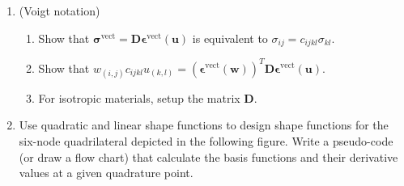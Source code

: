 \documentclass[12pt]{article}
\begin{document}
\begin{enumerate}
\begin{enumerate}
\item Consider the weak-form problem for elastostatics,
\begin{align*}
\int_{\Omega} w_{(i,j)} \sigma_{ij}d\Omega = \int_{\Omega} w_i f_i d\Omega + \int_{\Gamma_h} w_i h_i d\Gamma.
\end{align*}
If the test and trail function spaces are constructed by $C^0$ basis functions, show that
\begin{align*}
0 = \sum_{e=1}^{n_{el}} \int_{\Omega^e} w^h_i \left( \sigma^h_{ij,j} + f_i \right)d\Omega - \int_{\Gamma_h} w^h_i \left( \sigma^h_{ij}n_j - h_i \right) d\Gamma - \int_{\Gamma_{\mathrm{int}}} w^h_i \llbracket \sigma_{ij}n_j\rrbracket d\Gamma,
\end{align*}
wherein
\begin{align*}
\Gamma_{\mathrm{int}} := \cup_{e=1}^{n_{el}} \partial \Omega^e - \partial \Omega.
\end{align*}
From the above Euler-Lagrange equation, one may readily conclude that the Galerkin formulation implies
\begin{align*}
& \sigma_{ij,j} + f_i = 0, && \mbox{ in } \cup_{e=1}^{n_{el}} \Omega^e, \displaybreak[2]\\
& \sigma_{ij}n_j = h_i, && \mbox{ on } \Gamma_h, \displaybreak[2]\\
& \llbracket \sigma_{ij}n_j\rrbracket = 0, && \mbox{ on } \Gamma_{\mathrm{int}}.
\end{align*}
\end{enumerate}

\item(Voigt notation) 
\begin{enumerate}
\item Show that $\bm \sigma^{\mathrm{vect}} = \bm D \bm \epsilon^{\mathrm{vect}}(\bm u)$ is equivalent to $\sigma_{ij} = c_{ijkl} \sigma_{kl}$.
\item Show that $w_{(i,j)} c_{ijkl} u_{(k,l)} = \left( \bm \epsilon^{\mathrm{vect} }(\bm w)\right)^T \bm D \bm \epsilon^{\mathrm{vect}}(\bm u)$.
\item For isotropic materials, setup the matrix $\bm D$.
\end{enumerate}


\item Use quadratic and linear shape functions to design shape functions for the six-node quadrilateral depicted in the following figure. Write a pseudo-code (or draw a flow chart) that calculate the basis functions and their derivative values at a given quadrature point.


\end{enumerate}
\end{document}
